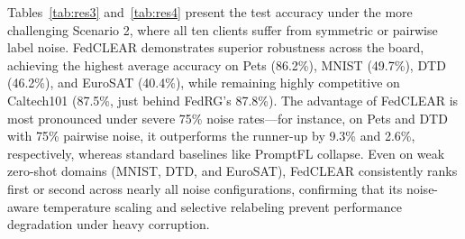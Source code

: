 \documentclass[runningheads]{llncs}
\begin{document}
Tables~\ref{tab:res3} and~\ref{tab:res4} present the test accuracy under the more challenging Scenario 2, where all ten clients suffer from symmetric or pairwise label noise. FedCLEAR demonstrates superior robustness across the board, achieving the highest average accuracy on Pets (86.2\%), MNIST (49.7\%), DTD (46.2\%), and EuroSAT (40.4\%), while remaining highly competitive on Caltech101 (87.5\%, just behind FedRG's 87.8\%). The advantage of FedCLEAR is most pronounced under severe 75\% noise rates—for instance, on Pets and DTD with 75\% pairwise noise, it outperforms the runner-up by 9.3\% and 2.6\%, respectively, whereas standard baselines like PromptFL collapse. Even on weak zero-shot domains (MNIST, DTD, and EuroSAT), FedCLEAR consistently ranks first or second across nearly all noise configurations, confirming that its noise-aware temperature scaling and selective relabeling prevent performance degradation under heavy corruption.
\end{document}
